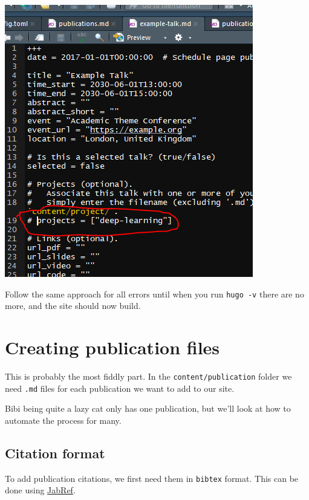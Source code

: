 \documentclass[12pt,]{book}
\theoremstyle{definition}
\theoremstyle{definition}
\theoremstyle{definition}
\theoremstyle{remark}
\begin{document}
\includegraphics[width=1.2\linewidth]{img/hugo-error2}

Follow the same approach for all errors until when you run
\texttt{hugo\ -v} there are no more, and the site should now build.

\hypertarget{creating-publication-files}{\chapter{Creating publication
files}\label{creating-publication-files}}

This is probably the most fiddly part. In the
\texttt{content/publication} folder we need \texttt{.md} files for each
publication we want to add to our site.

Bibi being quite a lazy cat only has one publication, but we'll look at
how to automate the process for many.

\section{Citation format}\label{citation-format}

To add publication citations, we first need them in \texttt{bibtex}
format. This can be done using \href{http://www.jabref.org/}{JabRef}.
\end{document}
